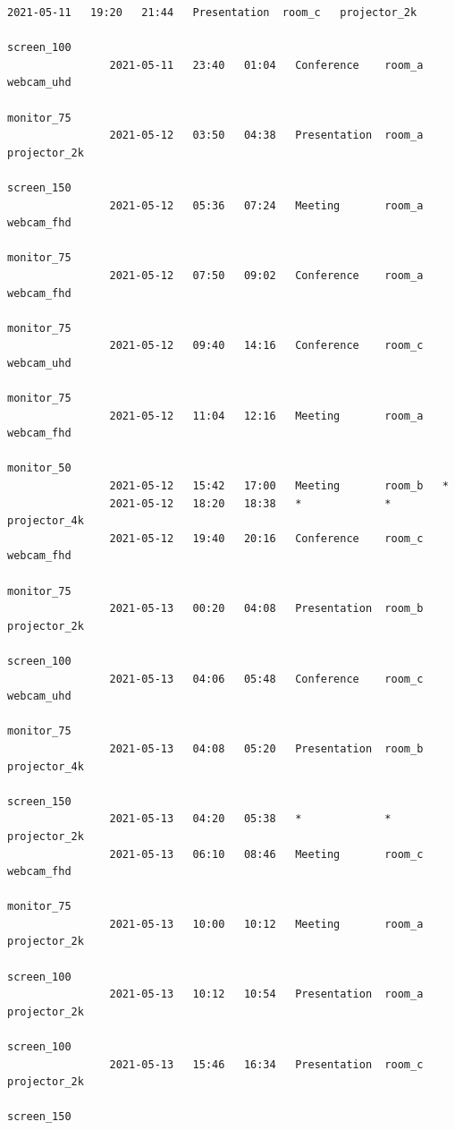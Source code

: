 \documentclass{article}
\begin{document}
\begin{Verbatim}[gobble=8]
                2021-05-11   19:20   21:44   Presentation  room_c   projector_2k
                                                                    screen_100
                2021-05-11   23:40   01:04   Conference    room_a   webcam_uhd
                                                                    monitor_75
                2021-05-12   03:50   04:38   Presentation  room_a   projector_2k
                                                                    screen_150
                2021-05-12   05:36   07:24   Meeting       room_a   webcam_fhd
                                                                    monitor_75
                2021-05-12   07:50   09:02   Conference    room_a   webcam_fhd
                                                                    monitor_75
                2021-05-12   09:40   14:16   Conference    room_c   webcam_uhd
                                                                    monitor_75
                2021-05-12   11:04   12:16   Meeting       room_a   webcam_fhd
                                                                    monitor_50
                2021-05-12   15:42   17:00   Meeting       room_b   *
                2021-05-12   18:20   18:38   *             *        projector_4k
                2021-05-12   19:40   20:16   Conference    room_c   webcam_fhd
                                                                    monitor_75
                2021-05-13   00:20   04:08   Presentation  room_b   projector_2k
                                                                    screen_100
                2021-05-13   04:06   05:48   Conference    room_c   webcam_uhd
                                                                    monitor_75
                2021-05-13   04:08   05:20   Presentation  room_b   projector_4k
                                                                    screen_150
                2021-05-13   04:20   05:38   *             *        projector_2k
                2021-05-13   06:10   08:46   Meeting       room_c   webcam_fhd
                                                                    monitor_75
                2021-05-13   10:00   10:12   Meeting       room_a   projector_2k
                                                                    screen_100
                2021-05-13   10:12   10:54   Presentation  room_a   projector_2k
                                                                    screen_100
                2021-05-13   15:46   16:34   Presentation  room_c   projector_2k
                                                                    screen_150

\end{Verbatim}
\end{document}
